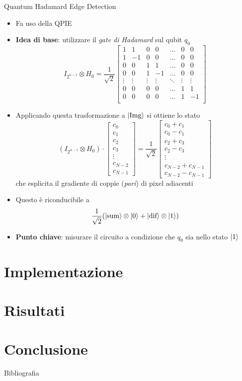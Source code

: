 \documentclass{beamer}
\DeclarePairedDelimiter\ket{\lvert}{\rangle}
\begin{document}
	\begin{frame}[allowframebreaks]{Quantum Hadamard Edge Detection}
		\begin{itemize}
			\item Fa uso della QPIE
			\item \textbf{Idea di base}: utilizzare il \emph{gate di Hadamard} sul qubit $q_0$
			\[
			I_{2^{n-1}} \otimes H_0 = \frac{1}{\sqrt 2}\begin{bmatrix}
				1 & 1 & 0 & 0 & \ldots & 0 & 0\\
				1 & -1 & 0 & 0 & \ldots & 0 & 0\\
				0 & 0 & 1 & 1 & \ldots & 0 & 0\\
				0 & 0 & 1 & -1 & \ldots & 0 & 0\\
				\vdots & \vdots & \vdots & \vdots & \ddots & \vdots & \vdots\\
				0 & 0 & 0 & 0 & \ldots & 1 & 1\\
				0 & 0 & 0 & 0 & \ldots & 1 & -1\\
			\end{bmatrix}
			\]
			\item Applicando questa trasformazione a $\ket{\text{Img}}$ si ottiene lo
			stato
			\[
			(I_{2^{n-1}} \otimes H_0) \cdot \begin{bmatrix}
				c_0\\ c_1\\ c_2\\ c_3\\ \vdots\\ c_{N-2}\\ c_{N-1}
			\end{bmatrix} = \frac{1}{\sqrt 2} \begin{bmatrix}
				c_0+c_1\\ c_0-c_1\\ c_2+c_3\\ c_2-c_3\\ \vdots\\ c_{N-2}+c_{N-1}\\ c_{N-2}-c_{N-1}
			\end{bmatrix}
			\]
			che esplicita il gradiente di coppie (\emph{pari}) di
			pixel adiacenti
			\item Questo è riconducibile a
			\[
			\frac{1}{\sqrt 2} (\ket{\text{sum}} \otimes \ket{0}
			+ \ket{\text{dif}} \otimes \ket{1})
			\]
			\item \textbf{Punto chiave}: misurare il circuito a condizione che $q_0$
			sia nello stato $\ket{1}$
		\end{itemize}
	\end{frame}


	\section{Implementazione}

	\section{Risultati}

	\section{Conclusione}

	\begin{frame}[allowframebreaks]{Bibliografia}
		\printbibliography
	\end{frame}
\end{document}
